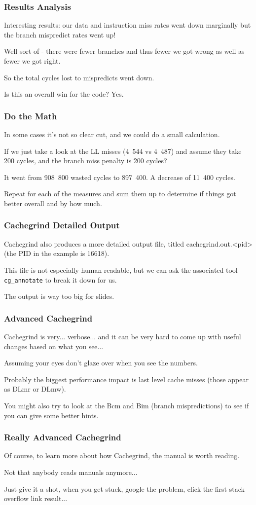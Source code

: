 \begin{frame}
\frametitle{Results Analysis}


Interesting results: our data and instruction miss rates went down marginally but the branch mispredict rates went up!

Well sort of - there were fewer branches and thus fewer we got wrong as well as fewer we got right. 

So the total cycles lost to mispredicts went down. 

Is this an overall win for the code? Yes. 


\end{frame}
\begin{frame}
\frametitle{Do the Math}

In some cases it's not so clear cut, and we could do a small calculation. 

If we just take a look at the LL misses (4~544 vs 4~487) and assume they take 200 cycles, and the branch miss penalty is 200 cycles?

It went from 908~800 wasted cycles to 897~400. A decrease of 11~400 cycles.

  Repeat for each of the measures and sum them up to determine if things got better overall and by how much.

\end{frame}
\begin{frame}
\frametitle{Cachegrind Detailed Output}

Cachegrind also produces a more detailed output file, titled cachegrind.out.<pid> (the PID in the example is 16618). 

This file is not especially human-readable, but we can ask the associated tool \texttt{cg\_annotate} to break it down for us.

The output is way too big for slides.

\end{frame}
\begin{frame}
\frametitle{Advanced Cachegrind}

Cachegrind is very... verbose... and it can be very hard to come up with useful changes based on what you see... 

Assuming your eyes don't glaze over when you see the numbers. 

Probably the biggest performance impact is last level cache misses (those appear as DLmr or DLmw). 

You might also try to look at the Bcm and Bim (branch mispredictions) to see if you can give some better hints. 
\end{frame}
\begin{frame}
\frametitle{Really Advanced Cachegrind}

Of course, to learn more about how Cachegrind, the manual is worth reading. 

Not that anybody reads manuals anymore... 

Just give it a shot, when you get stuck, google the problem, click the first stack overflow link result...


\end{frame}




